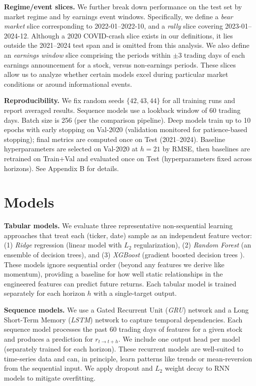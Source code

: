 \documentclass[10pt,twocolumn]{article}
\begin{document}
\textbf{Regime/event slices.} We further break down performance on the test set by market regime and by earnings event windows. Specifically, we define a \textit{bear market} slice corresponding to 2022-01--2022-10, and a \textit{rally} slice covering 2023-01--2024-12. Although a 2020 COVID-crash slice exists in our definitions, it lies outside the 2021--2024 test span and is omitted from this analysis. We also define an \textit{earnings window} slice comprising the periods within $\pm3$ trading days of each earnings announcement for a stock, versus non-earnings periods. These slices allow us to analyze whether certain models excel during particular market conditions or around informational events.

\textbf{Reproducibility.} We fix random seeds $\{42,43,44\}$ for all training runs and report averaged results. Sequence models use a lookback window of 60 trading days. Batch size is 256 (per the comparison pipeline). Deep models train up to 10 epochs with early stopping on Val-2020 (validation monitored for patience-based stopping); final metrics are computed once on Test (2021--2024). Baseline hyperparameters are selected on Val-2020 at $h=21$ by RMSE, then baselines are retrained on Train+Val and evaluated once on Test (hyperparameters fixed across horizons). See Appendix B for details.

\section{Models}
\textbf{Tabular models.} We evaluate three representative non-sequential learning approaches that treat each (ticker, date) sample as an independent feature vector: (1) \textit{Ridge} regression (linear model with $L_2$ regularization), (2) \textit{Random Forest} (an ensemble of decision trees), and (3) \textit{XGBoost} (gradient boosted decision trees \citep{chen2016xgboost}). These models ignore sequential order (beyond any features we derive like momentum), providing a baseline for how well static relationships in the engineered features can predict future returns. Each tabular model is trained separately for each horizon $h$ with a single-target output.

\textbf{Sequence models.} We use a Gated Recurrent Unit (\textit{GRU}) network \citep{cho2014learning} and a Long Short-Term Memory (\textit{LSTM}) network \citep{hochreiter1997long} to capture temporal dependencies. Each sequence model processes the past 60 trading days of features for a given stock and produces a prediction for $r_{t\to t+h}$. We include one output head per model (separately trained for each horizon). These recurrent models are well-suited to time-series data and can, in principle, learn patterns like trends or mean-reversion from the sequential input. We apply dropout and $L_2$ weight decay to RNN models to mitigate overfitting.
\end{document}
